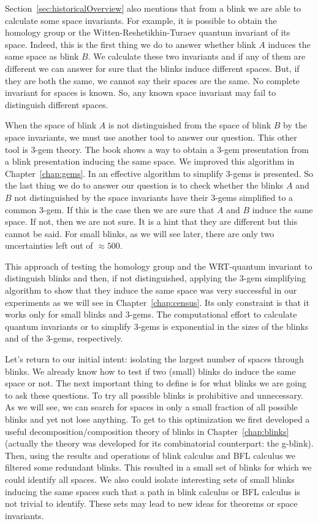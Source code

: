 Section~\ref{sec:historicalOverview} also mentions that from a blink we
are able to calculate some space invariants. For example, it is possible
to obtain the homology group or the Witten-Reshetikhin-Turaev
quantum invariant of its space. Indeed, this is the first thing we do
to answer whether blink $A$ induces the same space as blink $B$. We
calculate these two invariants and if any of them are different
we can answer for sure that the blinks induce different spaces. But,
if they are both the same, we cannot say their spaces are the same.
No complete invariant for spaces is known. So, any known space
invariant may fail to distinguish different spaces.

When the space of blink $A$ is not distinguished from the space
of blink $B$ by the space invariants, we must use another tool to answer
our question. This other tool is 3-gem theory. The book
\cite{kauffman1994tlr} shows a way to obtain a 3-gem presentation
from a blink presentation inducing the same space. We improved this
algorithm in Chapter~\ref{chap:gems}. In \cite{lins1995gca}
an effective algorithm to simplify 3-gems is presented. So the last thing
we do to answer our question is to check whether the
blinks $A$ and $B$ not distinguished by the space invariants have
their 3-gems simplified to a common 3-gem. If this is the case then
we are sure that $A$ and $B$ induce the same space. If not, then we
are not sure. It is a hint that they are different but this cannot
be said. For small blinks, as we will see later, there are only two
uncertainties left out of $\approx 500$.

This approach of testing the homology group and the WRT-quantum invariant
to distinguish blinks and then, if not distinguished,
applying the 3-gem simplifying algorithm to show that they induce
the same space was very successful in our experiments as we will
see in Chapter~\ref{chap:census}. Its only constraint is that
it works only for small blinks and 3-gems. The computational
effort to calculate quantum invariants or to simplify 3-gems is exponential
in the sizes of the blinks and of the 3-gems, respectively.

Let's return to our initial intent: isolating the largest number of
spaces through blinks. We already know how to test if two (small)
blinks do induce the same space or not. The next important thing
to define is for what blinks we are going to ask these questions.
To try all possible blinks is prohibitive and unnecessary. As we
will see, we can search for spaces in only a small fraction of all possible
blinks and yet not lose anything. To get to this optimization
we first developed a useful decomposition/composition theory
of blinks in Chapter~\ref{chap:blinks} (actually the theory was developed
for its combinatorial counterpart: the g-blink). Then, using the
results and operations of blink calculus and BFL calculus we filtered
some redundant blinks. This resulted in a small set of blinks for which we
could identify all spaces. We also could isolate interesting sets
of small blinks inducing the same spaces such that a path in blink
calculus or BFL calculus is not trivial to identify. These sets may
lead to new ideas for theorems or space invariants.

